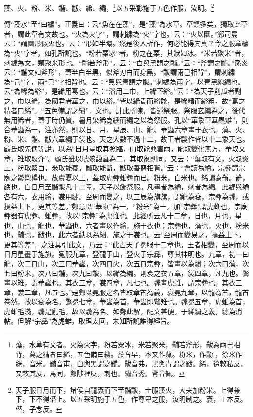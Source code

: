 藻、火、粉、米、黼、黻、絺、繡，\footnote{藻，水草有文者。火為火字，粉若粟冰，米若聚米，黼若斧形，黻為兩己相背，葛之精者曰絺，五色備曰繡。藻音早，本又作薻。粉米，作黺𪓋，徐米作{\hanaa 䋛}，音米。黼音甫，白與黑謂之黼。黻音弗，黑與青謂之黻。絺，徐敕私反，又敕其反，馬同，鄭陟裡反，刺也。繡音秀。背音佩。}以五采彰施于五色作服，汝明。\footnote{天子服日月而下，諸侯自龍袞而下至黼黻，士服藻火，大夫加粉米。上得兼下，下不得僣上。以五采明施于五色，作尊卑之服，汝明制之。袞，工本反。僣，子念反。}


{\noindent\zhuan{}\fzbyks 傳“藻水”至“曰繡”。正義曰：云“魚在在藻”，是“藻”為水草。草類多矣，獨取此草者，謂此草有文故也。“火為火字”，謂刺繡為“火”字也。云：“火以圜。”鄭司農云：“謂圜形似火也。云：“形如半環。”然是後人所作，何必能得其真？今之服章繡為“火”字者，如孔所說也。“粉若粟冰”者，粉之在粟，其狀如冰。“米若聚米”者，刺繡為文，類聚米形也。“黼若斧形”，云：“白與黑謂之黼。”云：“斧謂之黼。”孫炎云：“黼文如斧形”，蓋半白半黑，似斧刃白而身黑。“黻謂兩己相背”，謂刺繡為“己”字，兩“己”字相背也。云：“黑與青謂之黻。”刺繡為兩字，以青黑線繡也。云“為絺為綌”，是絺用葛也。云：“浴用二巾，上絺下綌。”云：“為天子削瓜者副之，巾以絺。為國君者華之，巾以綌。”皆以絺貴而綌賤，是絺精而綌粗，故“葛之精者曰絺”。“五色備謂之繡”，文也。計此所陳，皆述祭服。祭服玄纁為之，後代無用絺者，蓋于時仍質，暑月染絺為纁而繡之以為祭服。孔以“華象草華蟲雉”，則合華蟲為一，注亦然，則以日、月、星辰、山、龍、華蟲六章畫于衣也。藻、火、粉、米、黼、黻六章繡于裳也。天之大數不過十二，故王者製作皆以十二象天也。顧氏取先儒等說，以為“日月星取其照臨，山取能興雲雨，龍取變化無方，華取文章，雉取耿介”。顧氏雖以唬骸藹蟲為二，其取象則同。又云：“藻取有文，火取炎上，粉取絜白，米取能養，黼取能斷，黻取善惡相背。”云：“會讀為繪。宗彝謂宗廟之鬱鬯樽也。故虞夏以上，蓋取虎彝蜼彝而已。粉米，白米也。絺讀為黹。黹，紩也。自日月至黼黻凡十二章，天子以飾祭服。凡畫者為繪，刺者為繡。此繡與繪各有六，衣用繪，裳用繡。至周而變之，以三辰為旗旗，謂龍為袞，宗彝為毳，或損益上下，更其等差。”鄭意以“華蟲”為一，“粉米”為一，加“宗彝”謂虎蜼也。宗廟彝器有虎彝、蜼彝，故以“宗彝”為虎蜼也。此經所云凡十二章，日也，月也，星也，山也，龍也，華蟲也，六者畫以作繪，施于衣也；宗彝也，藻也，火也，粉米也，黼也，黻也，此六者紩以為繡，施之于裳也。云“至周而變易之，損益上下，更其等差”，之注具引此文，乃云：“此古天子冕服十二章也。王者相變，至周而以日月星畫于旌旗。冕服九章，登龍于山，登火于宗彝，尊其神明也。九章，初一曰龍，次二曰山，次三曰華蟲，次四曰火，次五曰宗彝，皆畫以為繢；次六曰藻，次七曰粉米，次八曰黼，次九曰黻，以絺為繡。則袞之衣五章，裳四章，凡九也。鷩畫以雉，謂華蟲也。其衣三章，裳四章，凡七也。毳畫虎蜼，謂宗彝也。其衣三章，裳二章，凡五也。”是鄭以冕服之名皆取章首為義，袞冕九章，以龍為首，龍首卷然，故以袞為名。鷩冕七章，華蟲為首，華蟲即鷩雉也。毳冕五章，虎蜼為首，虎蜼毛淺，毳是亂毛，故以毳為名。如鄭此解，配文甚便，于絺繡之義，總為消帖。但解“宗彝”為虎蜼，取理太回，未知所說誰得經旨。 \par}

